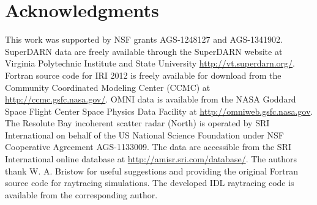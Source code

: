 \section*{Acknowledgments}
This work was supported by NSF grants AGS-1248127 and AGS-1341902. SuperDARN data are freely available through the SuperDARN website at Virginia Polytechnic Institute and State University \url{http://vt.superdarn.org/}. Fortran source code for IRI 2012 is freely available for download from the Community Coordinated Modeling Center (CCMC) at \url{http://ccmc.gsfc.nasa.gov/}. OMNI data is available from the NASA Goddard Space Flight Center Space Physics Data Facility at \url{http://omniweb.gsfc.nasa.gov}. The Resolute Bay incoherent scatter radar (North) is operated by SRI International on behalf of the US National Science Foundation under NSF Cooperative Agreement AGS-1133009. The data are accessible from the SRI International online database at \url{http://amisr.sri.com/database/}. The authors thank W. A. Bristow for useful suggestions and providing the original Fortran source code for raytracing simulations. The developed IDL raytracing code is available from the corresponding author.






